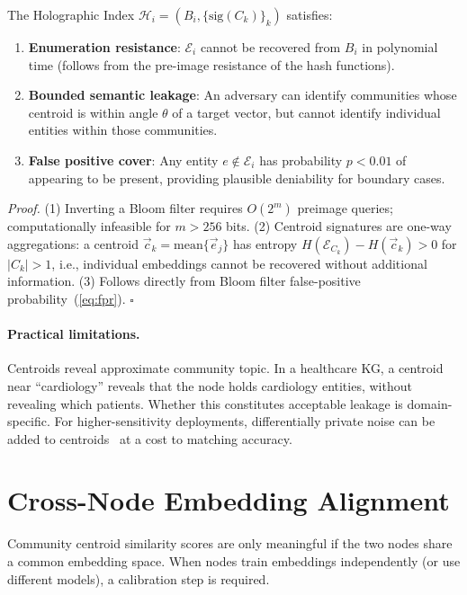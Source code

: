 \documentclass[10pt,twocolumn]{article}
\begin{document}
\begin{theorem}
\label{thm:privacy}
The Holographic Index $\mathcal{H}_i = (B_i, \{\mathrm{sig}(C_k)\}_k)$ satisfies:
\begin{enumerate}
  \item \textbf{Enumeration resistance}: $\mathcal{E}_i$ cannot be recovered from $B_i$
        in polynomial time (follows from the pre-image resistance of the hash functions).
  \item \textbf{Bounded semantic leakage}: An adversary can identify communities whose
        centroid is within angle $\theta$ of a target vector, but cannot identify
        individual entities within those communities.
  \item \textbf{False positive cover}: Any entity $e \notin \mathcal{E}_i$ has probability
        $p < 0.01$ of appearing to be present, providing plausible deniability for
        boundary cases.
\end{enumerate}
\end{theorem}

\textit{Proof.} (1) Inverting a Bloom filter requires $O(2^m)$ preimage queries;
computationally infeasible for $m > 256$ bits. (2) Centroid signatures are one-way
aggregations: a centroid $\vec{c}_k = \mathrm{mean}\{\vec{e}_j\}$ has entropy
$H(\mathcal{E}_{C_k}) - H(\vec{c}_k) > 0$ for $|C_k| > 1$, i.e., individual
embeddings cannot be recovered without additional information. (3) Follows directly
from Bloom filter false-positive probability~(\ref{eq:fpr}). $\square$

\paragraph{Practical limitations.}
Centroids reveal approximate community topic. In a healthcare KG, a centroid near
``cardiology'' reveals that the node holds cardiology entities, without revealing
which patients. Whether this constitutes acceptable leakage is domain-specific.
For higher-sensitivity deployments, differentially private noise can be added to
centroids~\cite{dwork2014dp} at a cost to matching accuracy.

\section{Cross-Node Embedding Alignment}
\label{sec:procrustes}

Community centroid similarity scores are only meaningful if the two nodes share a common
embedding space. When nodes train embeddings independently (or use different models),
a calibration step is required.
\end{document}

